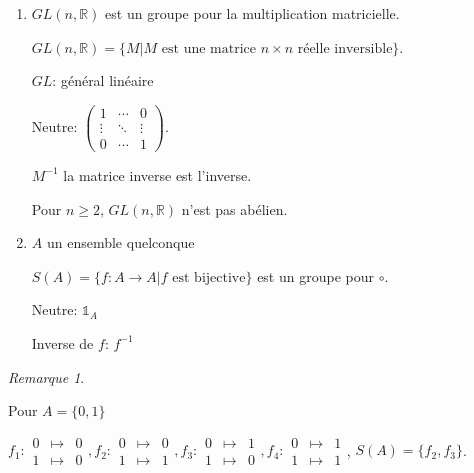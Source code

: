 \documentclass{report}
\theoremstyle{definition}
\theoremstyle{remark}
\newtheorem*{rema}{Remarque}
\begin{document}
	\begin{enumerate}[resume]
		\item $GL(n,\mathbb{R})$ est un groupe pour la multiplication matricielle.

		$GL(n,\mathbb{R})=\{M|M \text{ est une matrice $n\times n$ r\'eelle inversible}\}$.

		$GL$: g\'en\'eral lin\'eaire

		Neutre: $\left( \begin{array}{ccc}
			1&\dotsb&0\\
			\vdots&\ddots&\vdots\\
			0&\dotsb&1
		\end{array} \right)$.

		$M^{-1}$ la matrice inverse est l'inverse.

		Pour $n \geq 2$, $GL(n,\mathbb{R})$  n'est pas ab\'elien.
		\item $A$ un ensemble quelconque

		$S(A)=\{f:A \to A|f \text{ est bijective}\}$ est un groupe pour $\circ$.

		Neutre: $\mathds{1}_A$

		Inverse de $f$: $f^{-1}$
	\end{enumerate}
	\begin{rema}
		~

		Pour $A=\{0,1\}$

		$f_1:\begin{array}{rcl}
			0&\mapsto&0\\
			1&\mapsto&0
		\end{array},f_2:\begin{array}{rcl}
			0&\mapsto&0\\
			1&\mapsto&1
		\end{array},f_3:\begin{array}{rcl}
			0&\mapsto&1\\
			1&\mapsto&0
		\end{array},f_4:\begin{array}{rcl}
			0&\mapsto&1\\
			1&\mapsto&1
		\end{array}$, $S(A)=\{f_2,f_3\}$.
	\end{rema}
\end{document}
